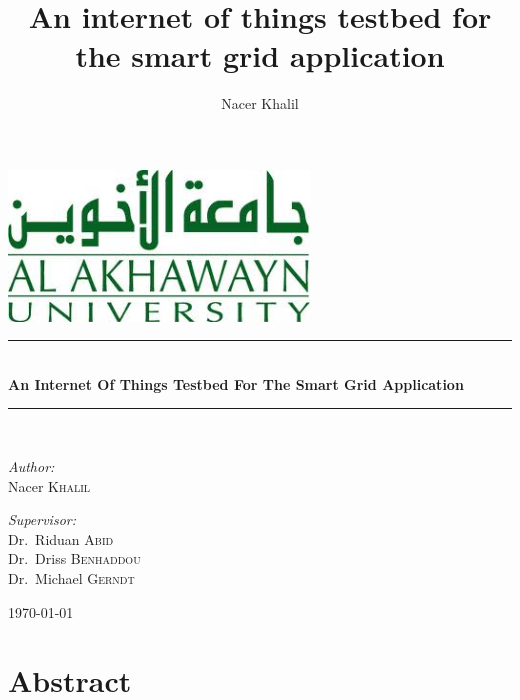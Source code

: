 \documentclass[12pt,a4paper,final]{report}
\author{Nacer Khalil}
\title{An internet of things testbed for the smart grid application}
\newcommand{\HRule}{\rule{\linewidth}{0.5mm}}
\begin{document}
\begin{titlepage}
\begin{center}
\includegraphics[width=0.6\textwidth]{img/aui_logo.jpg}
\linebreak
\linebreak
\linebreak
\linebreak
\linebreak
\linebreak
\HRule \\[0.4cm]
{ \huge \bfseries An Internet Of Things Testbed For The Smart Grid Application}\\[0.4cm]

\HRule \\[1.5cm]

\begin{minipage}{0.4\textwidth}
\begin{flushleft} \large
\emph{Author:}\\
Nacer \textsc{Khalil}
\end{flushleft}
\end{minipage}
\begin{minipage}{0.4\textwidth}
\begin{flushright} \large
\emph{Supervisor:} \\
Dr.~Riduan \textsc{Abid} \\
Dr.~Driss \textsc{Benhaddou} \\
Dr.~Michael \textsc{Gerndt} 
\end{flushright}
\end{minipage}

\vfill

{\large \today}

\end{center}
\end{titlepage}


\chapter{Abstract}
\end{document}
